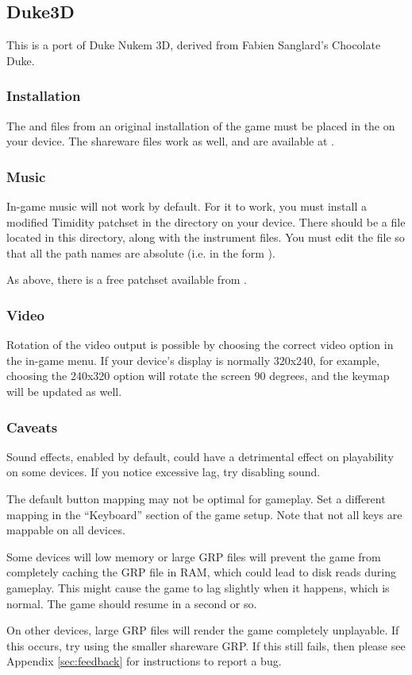 \subsection{Duke3D}


This is a port of Duke Nukem 3D, derived from Fabien Sanglard's
Chocolate Duke.

\subsubsection{Installation}
The  and  files from an original installation
of the game must be placed in the  on your
device. The shareware files work as well, and are available at
.

\subsubsection{Music}
In-game music will not work by default. For it to work, you must
install a modified Timidity patchset in the
 directory on your device. There should be
a  file located in this
directory, along with the instrument files. You must edit the
 file so that all the path names are absolute (i.e. in the
form ).

As above, there is a free patchset available from
.

\subsubsection{Video}
Rotation of the video output is possible by choosing the correct video
option in the in-game menu. If your device's display is normally
320x240, for example, choosing the 240x320 option will rotate the
screen 90 degrees, and the keymap will be updated as well.

\subsubsection{Caveats}
Sound effects, enabled by default, could have a detrimental effect on
playability on some devices. If you notice excessive lag, try
disabling sound.

The default button mapping may not be optimal for gameplay. Set a
different mapping in the ``Keyboard'' section of the game setup. Note
that not all keys are mappable on all devices.

Some devices will low memory or large GRP files will prevent the game
from completely caching the GRP file in RAM, which could lead to disk
reads during gameplay. This might cause the game to lag slightly when
it happens, which is normal. The game should resume in a second or so.

On other devices, large GRP files will render the game completely
unplayable. If this occurs, try using the smaller shareware GRP. If
this still fails, then please see Appendix \ref{sec:feedback} for
instructions to report a bug.
